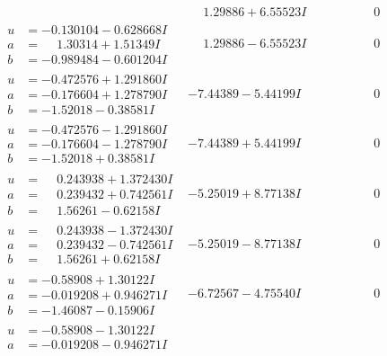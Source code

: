 \documentclass[1p]{elsarticle_modified}
\theoremstyle{definition}
\begin{document}
$$\begin{array}{c|c|c}
 & \phantom{-}1.29886 + 6.55523 I & \phantom{-0.000000 } 0 \\ \hline\begin{aligned}
u &= -0.130104 - 0.628668 I \\
a &= \phantom{-}1.30314 + 1.51349 I \\
b &= -0.989484 - 0.601204 I\end{aligned}
 & \phantom{-}1.29886 - 6.55523 I & \phantom{-0.000000 } 0 \\ \hline\begin{aligned}
u &= -0.472576 + 1.291860 I \\
a &= -0.176604 + 1.278790 I \\
b &= -1.52018 - 0.38581 I\end{aligned}
 & -7.44389 - 5.44199 I & \phantom{-0.000000 } 0 \\ \hline\begin{aligned}
u &= -0.472576 - 1.291860 I \\
a &= -0.176604 - 1.278790 I \\
b &= -1.52018 + 0.38581 I\end{aligned}
 & -7.44389 + 5.44199 I & \phantom{-0.000000 } 0 \\ \hline\begin{aligned}
u &= \phantom{-}0.243938 + 1.372430 I \\
a &= \phantom{-}0.239432 + 0.742561 I \\
b &= \phantom{-}1.56261 - 0.62158 I\end{aligned}
 & -5.25019 + 8.77138 I & \phantom{-0.000000 } 0 \\ \hline\begin{aligned}
u &= \phantom{-}0.243938 - 1.372430 I \\
a &= \phantom{-}0.239432 - 0.742561 I \\
b &= \phantom{-}1.56261 + 0.62158 I\end{aligned}
 & -5.25019 - 8.77138 I & \phantom{-0.000000 } 0 \\ \hline\begin{aligned}
u &= -0.58908 + 1.30122 I \\
a &= -0.019208 + 0.946271 I \\
b &= -1.46087 - 0.15906 I\end{aligned}
 & -6.72567 - 4.75540 I & \phantom{-0.000000 } 0 \\ \hline\begin{aligned}
u &= -0.58908 - 1.30122 I \\
a &= -0.019208 - 0.946271 I \\

\end{aligned}
\end{array}$$
\end{document}
